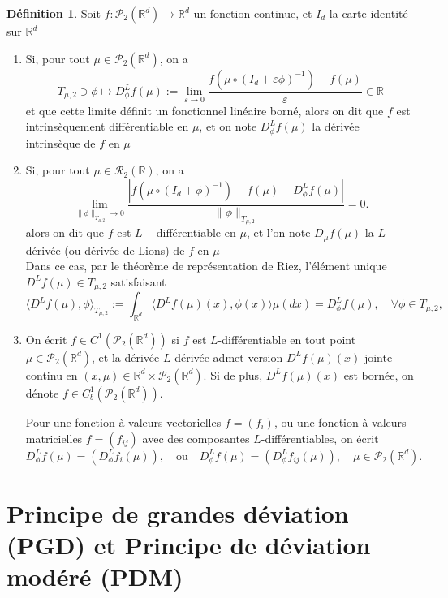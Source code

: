\documentclass[12pt,a4paper,twoside]{book}%
\theoremstyle{definition}
\newtheorem{dfn}{Définition}[section]
\numberwithin{equation}{section}
\begin{document}
\begin{dfn}
	Soit $f:\mathcal{P}_2(\mathbb{R}^d)\longrightarrow\mathbb{R}^d$ un fonction continue, et $I_d$ la carte identité sur $\mathbb{R}^d$
	
	\begin{enumerate}
		\item Si, pour tout $\mu\in\mathcal{P}_2(\mathbb{R}^d)$, on a
		\[
		T_{\mu,2}\ni\phi \mapsto D^L_{\phi}f(\mu):=\lim_{\varepsilon\to 0}\frac{f(\mu\circ(I_d+\varepsilon\phi)^{-1})-f(\mu)}{\varepsilon}\in\mathbb{R}
		\]
		et que cette limite définit un fonctionnel linéaire borné, alors on dit que $f$ est intrinsèquement différentiable en $\mu$, et on note $D^L_{\phi}f(\mu)$ la dérivée intrinsèque de $f$ en $\mu$

	\item Si, pour tout $\mu\in\mathcal{R}_2(\mathbb{R})$, on a
	\[
\lim_{\|\phi\|_{T_{\mu,2}} \to 0} \frac{|f(\mu \circ (I_d + \phi)^{-1}) - f(\mu) - D^L_\phi f(\mu)|}{\|\phi\|_{T_{\mu,2}}} = 0.
 \]
 alors on dit que $f$ est $L-$différentiable en $\mu$, et l'on note $D_\mu f(\mu)$ la $L-$dérivée (ou dérivée de Lions) de $f$ en $\mu$
\\ Dans ce cas, par le théorème de représentation de Riez, l'élément unique $D^Lf(\mu)\in T_{\mu,2}$ satisfaisant
 \[
 \langle D^L f(\mu), \phi \rangle_{T_{\mu,2}} := \int_{\mathbb{R}^d} \langle D^L f(\mu)(x), \phi(x) \rangle \mu(dx) = D^L_\phi f(\mu), \quad \forall \phi \in T_{\mu,2},
 \]
 \item  On écrit \( f \in C^1(\mathcal{P}_2(\mathbb{R}^d)) \) si \( f \) est \( L \)-différentiable en tout point \( \mu \in \mathcal{P}_2(\mathbb{R}^d) \), et la dérivée \( L \)-dérivée admet version \( D^L f(\mu)(x) \) jointe continu en \( (x, \mu) \in \mathbb{R}^d \times \mathcal{P}_2(\mathbb{R}^d) \). Si de plus, \( D^L f(\mu)(x) \) est bornée, on dénote \( f \in C_b^1(\mathcal{P}_2(\mathbb{R}^d)) \).
 
 Pour une fonction à valeurs vectorielles $f = (f_i)$, ou une fonction à valeurs matricielles $f = (f_{ij})$ avec des composantes $L$-différentiables, on écrit
 \[
 D^L_\phi f(\mu) = (D^L_\phi f_i(\mu)), \quad \text{ou} \quad D^L_\phi f(\mu) = (D^L_\phi f_{ij}(\mu)), \quad \mu \in \mathcal{P}_2(\mathbb{R}^d).
 \] 
 	\end{enumerate}
\end{dfn}


\section{Principe de grandes déviation (PGD) et Principe de déviation modéré (PDM)}
\end{document}
